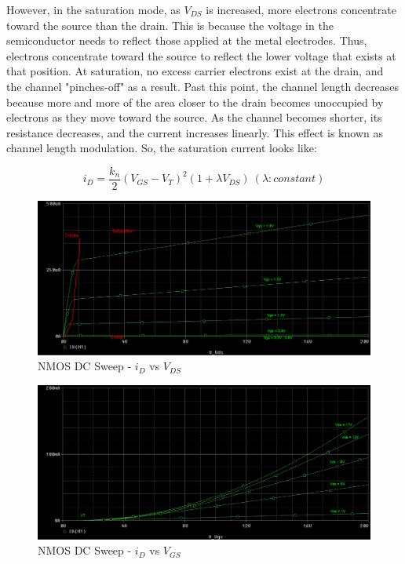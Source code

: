However, in the saturation mode, as $V_{DS}$ is increased, more electrons concentrate toward the source than the drain. This is because the voltage in the semiconductor needs to reflect those applied at the metal electrodes. Thus, electrons concentrate toward the source to reflect the lower voltage that exists at that position. At saturation, no excess carrier electrons exist at the drain, and the channel "pinches-off" as a result. Past this point, the channel length decreases because more and more of the area closer to the drain becomes unoccupied by electrons as they move toward the source. As the channel becomes shorter, its resistance decreases, and the current increases linearly. This effect is known as channel length modulation. So, the saturation current looks like:

\begin{equation}
	\label{eq:sat_current_clm}
	i_D = \frac{k_n}{2} ( V_{GS} - V_{T} )^2 ( 1 + \lambda V_{DS} ) \ ( \lambda: constant )
\end{equation}

\FloatBarrier

\begin{figure}[h!]
	\centering
	\includegraphics[scale=0.25]{./images/circuit1_vds_sweep.PNG}
	\caption{NMOS DC Sweep - $i_D$ vs $V_{DS}$}
	\label{fig:circuit1_vds_sweep}
\end{figure}

\FloatBarrier

\FloatBarrier

\begin{figure}[h!]
	\centering
	\includegraphics[scale=0.5]{./images/circuit1_full_sweep.PNG}
	\caption{NMOS DC Sweep - $i_D$ vs $V_{GS}$}
	\label{fig:circuit1_full_sweep}
\end{figure}

